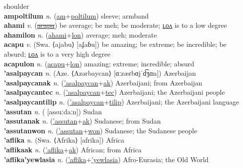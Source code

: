 shoulder \label{amtokalyot} \\
\textbf{ampoltilum} \textit{n.} (\hyperref[am]{am}+\hyperref[poltilum]{poltilum})
sleeve; armband \label{ampoltilum} \\
\textbf{ahami} \textit{v.} (\hyperref[acapu]{\sout{acapu}})
be average; be meh; be moderate; \hyperref[ahamilon]{ʟᴏᴧ} is to a low degree \label{ahami} \\
\textbf{ahamilon} \textit{n.} (\hyperref[ahami]{ahami}+\hyperref[lon]{lon})
average; meh; moderate \label{ahamilon} \\
\textbf{acapu} \textit{v.} (Swa. ⟨ajabu⟩ [aʄaɓu])
be amazing; be extreme; be incredible; be absurd; \hyperref[acapulon]{ʟᴏᴧ} is to a very high degree \label{acapu} \\
\textbf{acapulon} \textit{n.} (\hyperref[acapu]{acapu}+\hyperref[lon]{lon})
amazing; extreme; incredible; absurd \label{acapulon} \\
\textbf{'asalpaycan} \textit{n.} (Aze. ⟨Azərbaycan⟩ [ɑːzæɾbɑjˈd͡ʒɑn])
Azerbaijan \label{'asalpaycan} \\
\textbf{'asalpaycanak} \textit{n.} (\hyperref['asalpaycan]{'asalpaycan}+\hyperref[ak]{ak})
Azerbaijani; from Azerbaijan \label{'asalpaycanak} \\
\textbf{'asalpaycantec} \textit{n.} (\hyperref['asalpaycan]{'asalpaycan}+\hyperref[tec]{tec})
Azerbaijani; the Azerbaijani people \label{'asalpaycantec} \\
\textbf{'asalpaycantilip} \textit{n.} (\hyperref['asalpaycan]{'asalpaycan}+\hyperref[tilip]{tilip})
Azerbaijani; the Azerbaijani language \label{'asalpaycantilip} \\
\textbf{'assutan} \textit{n.} ( [assuːdaːn])
Sudan \label{'assutan} \\
\textbf{'assutanak} \textit{n.} (\hyperref['assutan]{'assutan}+\hyperref[ak]{ak})
Sudanese; from Sudan \label{'assutanak} \\
\textbf{'assutanwon} \textit{n.} (\hyperref['assutan]{'assutan}+\hyperref[won]{won})
Sudanese; the Sudanese people \label{'assutanwon} \\
\textbf{'aflika} \textit{n.} (Swa. ⟨Afrika⟩ [afrika])
Africa \label{'aflika} \\
\textbf{'aflikaak} \textit{n.} (\hyperref['aflika]{'aflika}+\hyperref[ak]{ak})
African; from Africa \label{'aflikaak} \\
\textbf{'aflika'yewlasia} \textit{n.} (\hyperref['aflika]{'aflika}+\hyperref['yewlasia]{'yewlasia})
Afro-Eurasia; the Old World \label{'aflika'yewlasia} \\
